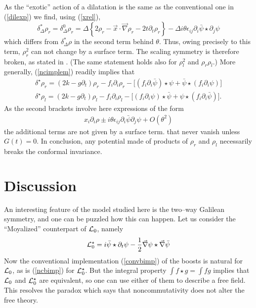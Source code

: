 \documentclass[a4paper,11pt]{article}
\let\ssection=\section
\renewcommand{\section}{\setcounter{equation}{0}\ssection}
\def\p{{\partial}}
\def\vx{{\vec x}}
\def\vnabla{{\vec\nabla}}
\begin{document}
As the ``exotic'' action of a dilatation
is the same as the conventional one
in (\ref{dilexp}) we find, using (\ref{xrel}),
\begin{equation}
     \delta_{\Delta}^*\rho_{r}=\delta_{\Delta}^0\rho_{r}
     =\Delta\left\{
     2\rho_{r}-\vx\cdot\vnabla\rho_{r}-2t\p_{t}\rho_{r}\right\}
     -\Delta i\theta\epsilon_{ij}\p_{i}\bar{\psi}\star\p_{j}\psi
     \label{exodilondens}
\end{equation}
which differs from $\delta^*_{\Delta}\rho$ in the second term
behind $\theta$. Thus, owing precisely to this term,
$\rho_{r}^2$ can not change by a surface term.
The scaling symmetry is
therefore broken,  as stated in \cite{Baketal}.
(The same statement holds also for $\rho_{l}^2$
and $\rho_{r}\rho_{l}$.)
More generally, (\ref{ncimplem})  readily implies that
\begin{equation}
     \begin{array}{ll}
\delta^{\star}\rho_{r}
=
(2k-g\p_{t})\rho_{r}-f_{i}\p_{i}\rho_{r}
-\Big[(f_{i}\p_{i}\bar{\psi})\star\psi
+\bar{\psi}\star (f_{i}\p_{i}\psi)\Big]
\\[8pt]
\delta^{\star}\rho_{l}=
(2k-g\p_{t})\rho_{l}-f_{i}\p_{i}\rho_{l}
-\Big[(f_{i}\p_{i}\psi)\star\bar{\psi}
+\psi\star (f_{i}\p_{i}\bar{\psi})\Big].
\end{array}
\end{equation}
As the second brackets involve here expressions of the form
\begin{eqnarray*}
     x_{i}\p_{i}\rho\pm i\theta\epsilon_{ij}
\p_{i}\bar{\psi}\p_{j}{\psi}+O(\theta^2)
\end{eqnarray*}
the additional terms are not given by a surface term.
that never vanish unless $G(t)=0$.
In conclusion, any potential made of products of
$\rho_{r}$ and $\rho_{l}$  necessarily
breaks the conformal invariance.

\section{Discussion}

An interesting feature of the model studied here
is the two--way Galilean symmetry, and one can be
puzzled how this can happen. Let us consider the ``Moyalized''
counterpart of ${\cal L}_{0}$, namely
\begin{equation}
     {\cal L}_{0}^\star
     =i\bar{\psi}\star\p_{t}\psi-
     \frac{1}{2}\vnabla\psi\star\vnabla\bar{\psi}
     \label{staraction}
\end{equation}
Now the conventional implementation (\ref{convbimp})
of the boosts is natural for ${\cal L}_{0}$,
as is (\ref{ncbimp})
for ${\cal L}_{0}^\star$. But the integral property
$\int\! f\star g=\int\! fg$ implies  that ${\cal L}_{0}$
and ${\cal L}_{0}^\star$ are equivalent, so one can use either
of them to describe a free field.
This resolves the paradox which says that
noncommutativity does not alter the free theory.
\end{document}
